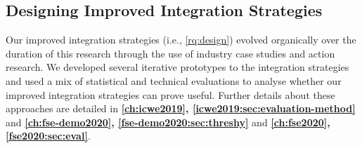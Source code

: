 \subsection{Designing Improved Integration Strategies}

Our improved integration strategies (i.e., \ref{rq:design}) evolved organically over the duration of this research through the use of industry case studies and action research. We developed several iterative prototypes to the integration strategies and used a mix of statistical and technical evaluations to analyse whether our improved integration strategies can prove useful. Further details about these approaches are detailed in \textbf{\cref{ch:icwe2019}, \cref{icwe2019:sec:evaluation-method}} and \textbf{\cref{ch:fse-demo2020}, \cref{fse-demo2020:sec:threshy}} and \textbf{\cref{ch:fse2020}, \cref{fse2020:sec:eval}}.
